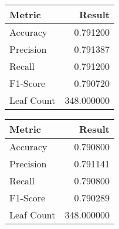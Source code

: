 \begin{tabular}{lr}
\toprule
    Metric &     Result \\
\midrule
  Accuracy &   0.791200 \\
 Precision &   0.791387 \\
    Recall &   0.791200 \\
  F1-Score &   0.790720 \\
Leaf Count & 348.000000 \\
\bottomrule
\end{tabular}
\begin{tabular}{lr}
\toprule
    Metric &     Result \\
\midrule
  Accuracy &   0.790800 \\
 Precision &   0.791141 \\
    Recall &   0.790800 \\
  F1-Score &   0.790289 \\
Leaf Count & 348.000000 \\
\bottomrule
\end{tabular}
